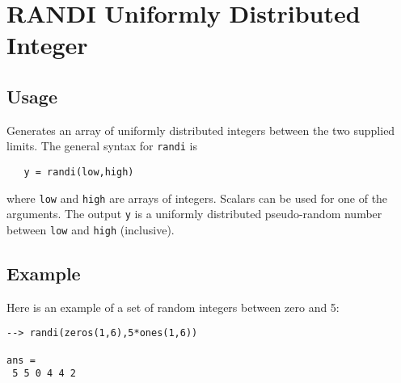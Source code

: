 \section{RANDI Uniformly Distributed Integer}

\subsection{Usage}

Generates an array of uniformly distributed integers between
the two supplied limits.  The general syntax for \verb|randi| is
\begin{verbatim}
   y = randi(low,high)
\end{verbatim}
where \verb|low| and \verb|high| are arrays of integers.  Scalars
can be used for one of the arguments.  The output \verb|y| is
a uniformly distributed pseudo-random number between \verb|low|
and \verb|high| (inclusive).
\subsection{Example}

Here is an example of a set of random integers between 
zero and 5:
\begin{verbatim}
--> randi(zeros(1,6),5*ones(1,6))

ans = 
 5 5 0 4 4 2 
\end{verbatim}
